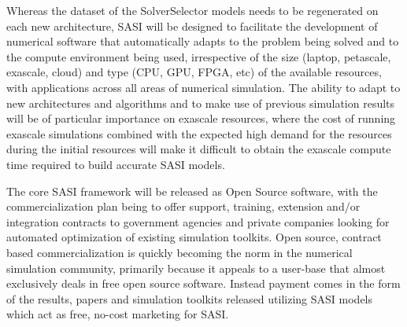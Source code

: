Whereas the dataset of the SolverSelector models needs to be regenerated on each new architecture, SASI will be designed to facilitate the development of numerical software that automatically adapts to the problem being solved and to the compute environment being used, irrespective of the size (laptop, petascale, exascale, cloud) and type (CPU, GPU, FPGA, etc) of the available resources, with applications across all areas of numerical simulation. The ability to adapt to new architectures and algorithms and to make use of previous simulation results will be of particular importance on exascale resources, where the cost of running exascale simulations combined with the expected high demand for the resources during the initial resources will make it difficult to obtain the exascale compute time required to build accurate SASI models. 

The core SASI framework will be released as Open Source software, with the commercialization plan being to offer support, training, extension and/or integration contracts to government agencies and private companies looking for automated optimization of existing simulation toolkits.  Open source, contract based commercialization is quickly becoming the norm in the numerical simulation community, primarily because it appeals to a user-base that almost exclusively deals in free open source software. Instead payment comes in the form of the results, papers and simulation toolkits released utilizing SASI models which act as free, no-cost marketing for SASI.
